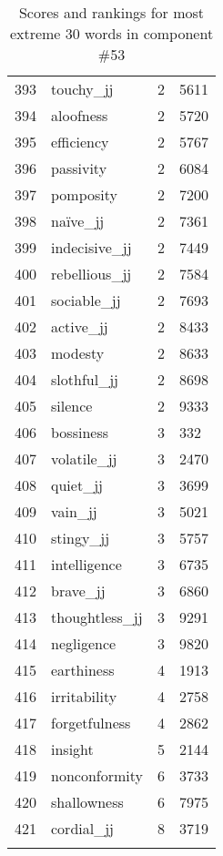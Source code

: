 \begin{longtable}[!htbp]{| rlr@{.}l |}
    393 & touchy\_jj & 2 & 5611 \\
    394 & aloofness & 2 & 5720 \\
    395 & efficiency & 2 & 5767 \\
    396 & passivity & 2 & 6084 \\
    397 & pomposity & 2 & 7200 \\
    398 & naïve\_jj & 2 & 7361 \\
    399 & indecisive\_jj & 2 & 7449 \\
    400 & rebellious\_jj & 2 & 7584 \\
    401 & sociable\_jj & 2 & 7693 \\
    402 & active\_jj & 2 & 8433 \\
    403 & modesty & 2 & 8633 \\
    404 & slothful\_jj & 2 & 8698 \\
    405 & silence & 2 & 9333 \\
    406 & bossiness & 3 & 332 \\
    407 & volatile\_jj & 3 & 2470 \\
    408 & quiet\_jj & 3 & 3699 \\
    409 & vain\_jj & 3 & 5021 \\
    410 & stingy\_jj & 3 & 5757 \\
    411 & intelligence & 3 & 6735 \\
    412 & brave\_jj & 3 & 6860 \\
    413 & thoughtless\_jj & 3 & 9291 \\
    414 & negligence & 3 & 9820 \\
    415 & earthiness & 4 & 1913 \\
    416 & irritability & 4 & 2758 \\
    417 & forgetfulness & 4 & 2862 \\
    418 & insight & 5 & 2144 \\
    419 & nonconformity & 6 & 3733 \\
    420 & shallowness & 6 & 7975 \\
    421 & cordial\_jj & 8 & 3719 \\
    \hline
    \caption{Scores and rankings for most extreme 30 words in component \#53} \\
\end{longtable}
